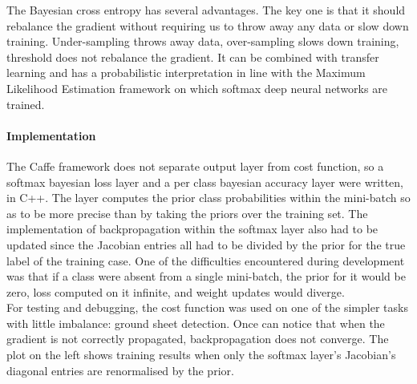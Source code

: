 \documentclass[a4paper,11pt]{article}
\begin{document}
The Bayesian cross entropy has several advantages. The key one is that it should rebalance the gradient without requiring us to throw away any data or slow down training. Under-sampling throws away data, over-sampling slows down training, threshold does not rebalance the gradient. It can be combined with transfer learning and has a probabilistic interpretation in line with the Maximum Likelihood Estimation framework on which softmax deep neural networks are trained. \\


\paragraph{Implementation}

The Caffe framework does not separate output layer from cost function, so a softmax bayesian loss layer and a per class bayesian accuracy layer were written, in C++. The layer computes the prior class probabilities within the mini-batch so as to be more precise than by taking the priors over the training set. The implementation of backpropagation within the softmax layer also had to be updated since the Jacobian entries all had to be divided by the prior for the true label of the training case. One of the difficulties encountered during development was that if a class were absent from a single mini-batch, the prior for it would be zero, loss computed on it infinite, and weight updates would diverge. \\

For testing and debugging, the cost function was used on one of the simpler tasks with little imbalance: ground sheet detection. Once can notice that when the gradient is not correctly propagated, backpropagation does not converge. The plot on the left shows training results when only the softmax layer's Jacobian's diagonal entries are renormalised by the prior. \\
\end{document}

